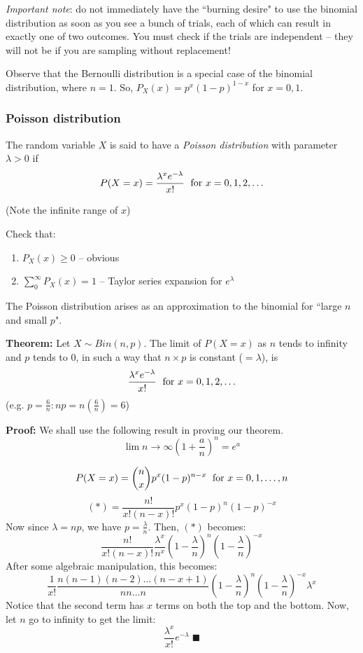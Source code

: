 \documentclass[12pt]{article}
\begin{document}
\emph{Important note}: do not immediately have the ``burning desire" to use the binomial distribution as soon as you see a bunch of trials, each of which can result in exactly one of two outcomes. You must check if the trials are independent -- they will not be if you are sampling without replacement!

Observe that the Bernoulli distribution is a special case of the binomial distribution, where $n = 1$. So, $P_X (x) = p^x (1-p)^{1-x}$ for $x = 0,1$.


\subsubsection{Poisson distribution}

The random variable $X$ is said to have a \emph{Poisson distribution} with parameter $\lambda > 0$ if
\[
    P(X = x) = \frac{ \lambda^x e^{- \lambda}}{x!} \; \textnormal{ for } x = 0,1,2,\ldots
\]

(Note the infinite range of $x$)

Check that:
\begin{enumerate}
    \item $P_X (x) \geq 0$ -- obvious
    \item $\sum_0^{\infty} P_X (x) = 1$ -- Taylor series expansion for $e^{\lambda}$
\end{enumerate}

The Poisson distribution arises as an approximation to the binomial for ``large $n$ and small $p$".

\textbf{Theorem:} Let $X \sim Bin(n,p)$. The limit of $P(X=x)$ as $n$ tends to infinity and $p$ tends to 0, in such a way that $n \times p$ is constant ($ = \lambda$), is
\[
    \frac{ \lambda^x e^{- \lambda}}{x!} \; \textnormal{ for } x = 0,1,2,\ldots
\]
(e.g. $p = \frac{6}{n} : np = n(\frac{6}{n}) = 6$)

\textbf{Proof:} We shall use the following result in proving our theorem.
\[
    \lim{n \to \infty} (1 + \frac{a}{n})^n = e^a
\]

\[
    P(X = x) = {n \choose x} p^x (1-p)^{n-x} \; \textnormal{ for } x = 0,1,\ldots,n
\]
\[
    (*) = \frac{n!}{x! (n-x)!} p^x (1-p)^n (1-p)^{-x}
\]
Now since $\lambda = np$, we have $p = \frac{\lambda}{n}$. Then, $(*)$ becomes:
\[
    \frac{n!}{x! (n-x)!} \frac{\lambda^x}{n^x} (1 - \frac{\lambda}{n})^n (1 - \frac{\lambda}{n})^{-x}
\]
After some algebraic manipulation, this becomes:
\[
    \frac{1}{x!} \frac{n (n-1) (n-2) \ldots (n-x+1)}{n n \ldots n} (1 - \frac{\lambda}{n})^n (1 - \frac{\lambda}{n})^{-x} \lambda^x
\]
Notice that the second term has $x$ terms on both the top and the bottom. Now, let $n$ go to infinity to get the limit:
\[
    \frac{\lambda^x}{x!} e^{- \lambda} \; \blacksquare
\]
\end{document}
